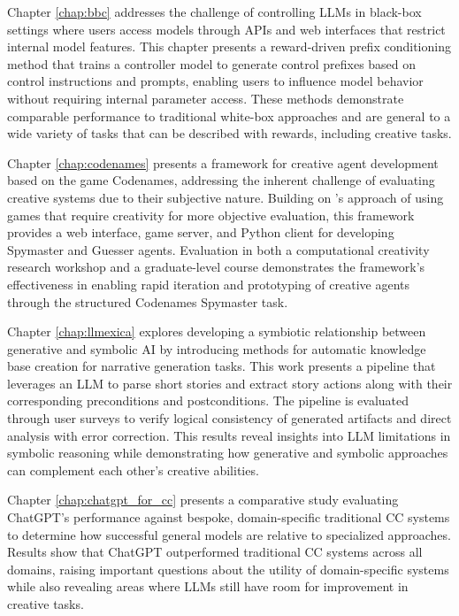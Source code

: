 \documentclass[phd,electronic,oneside,twosidetoc,letterpaper,chaptercenter,parttop,lof]{byumsphd}
\begin{document}
Chapter \ref{chap:bbc} addresses the challenge of controlling LLMs in black-box settings where users access models through APIs and web interfaces that restrict internal model features. 
This chapter presents a reward-driven prefix conditioning method that trains a controller model to generate control prefixes based on control instructions and prompts, enabling users to influence model behavior without requiring internal parameter access. 
These methods demonstrate comparable performance to traditional white-box approaches and are general to a wide variety of tasks that can be described with rewards, including creative tasks.

Chapter \ref{chap:codenames} presents a framework for creative agent development based on the game Codenames, addressing the inherent challenge of evaluating creative systems due to their subjective nature. 
Building on \citeauthor{spendlove2022competitive}'s approach of using games that require creativity for more objective evaluation, this framework provides a web interface, game server, and Python client for developing Spymaster and Guesser agents. 
Evaluation in both a computational creativity research workshop and a graduate-level course demonstrates the framework's effectiveness in enabling rapid iteration and prototyping of creative agents through the structured Codenames Spymaster task.

Chapter \ref{chap:llmexica} explores developing a symbiotic relationship between generative and symbolic AI by introducing methods for automatic knowledge base creation for narrative generation tasks. 
This work presents a pipeline that leverages an LLM to parse short stories and extract story actions along with their corresponding preconditions and postconditions. 
The pipeline is evaluated through user surveys to verify logical consistency of generated artifacts and direct analysis with error correction. 
This results reveal insights into LLM limitations in symbolic reasoning while demonstrating how generative and symbolic approaches can complement each other's creative abilities.

Chapter \ref{chap:chatgpt_for_cc} presents a comparative study evaluating ChatGPT's performance against bespoke, domain-specific traditional CC systems to determine how successful general models are relative to specialized approaches.
Results show that ChatGPT outperformed traditional CC systems across all domains, raising important questions about the utility of domain-specific systems while also revealing areas where LLMs still have room for improvement in creative tasks.
\end{document}
